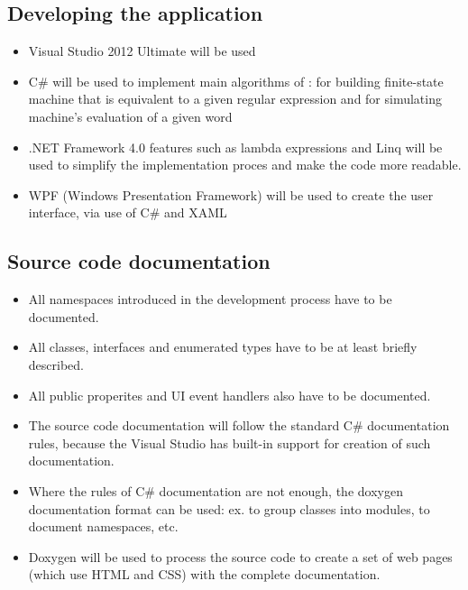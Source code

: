 \documentclass{article}
\begin{document}
\subsection{Developing the application}

\begin{itemize}

  \item Visual Studio 2012 Ultimate will be used

  \item C\# will be used to implement main algorithms of \titletext: for building finite-state
  machine that is equivalent to a given regular expression and for simulating machine's evaluation
  of a given word

  \item .NET Framework 4.0 features such as lambda expressions and Linq will be used to simplify the
  implementation proces and make the code more readable.

  \item WPF (Windows Presentation Framework) will be used to create the user interface, via use of
  C\# and XAML

\end{itemize}

\subsection{Source code documentation}

\begin{itemize}

  \item All namespaces introduced in the development process have to be documented. 

  \item All classes, interfaces and enumerated types have to be at least briefly described. 

  \item All public properites and UI event handlers also have to be documented.

  \item The source code documentation will follow the standard C\# documentation rules, because the
  Visual Studio has built-in support for creation of such documentation.

  \item Where the rules of C\# documentation are not enough, the doxygen documentation format can be
  used: ex. to group classes into modules, to document namespaces, etc.

  \item Doxygen will be used to process the source code to create a set of web pages (which use HTML
  and CSS) with the complete documentation.

\end{itemize}
\end{document}
